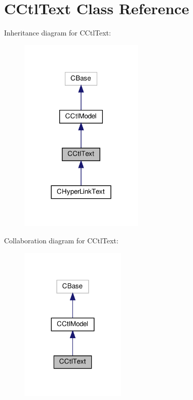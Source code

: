 \hypertarget{classCCtlText}{}\section{C\+Ctl\+Text Class Reference}
\label{classCCtlText}


Inheritance diagram for C\+Ctl\+Text\+:
\nopagebreak
\begin{figure}[H]
\begin{center}
\leavevmode
\includegraphics[width=168pt]{classCCtlText__inherit__graph}
\end{center}
\end{figure}


Collaboration diagram for C\+Ctl\+Text\+:
\nopagebreak
\begin{figure}[H]
\begin{center}
\leavevmode
\includegraphics[width=143pt]{classCCtlText__coll__graph}
\end{center}
\end{figure}
